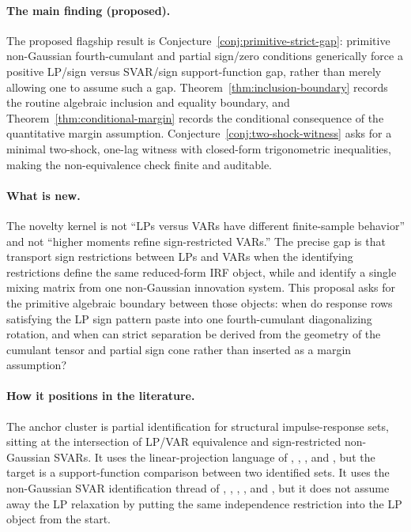 \documentclass[11pt]{article}
\theoremstyle{definition}
\theoremstyle{plain}
\theoremstyle{remark}
\begin{document}
\paragraph{The main finding (proposed).}
The proposed flagship result is Conjecture~\ref{conj:primitive-strict-gap}: primitive non-Gaussian fourth-cumulant and partial sign/zero conditions generically force a positive LP/sign versus SVAR/sign support-function gap, rather than merely allowing one to assume such a gap.  Theorem~\ref{thm:inclusion-boundary} records the routine algebraic inclusion and equality boundary, and Theorem~\ref{thm:conditional-margin} records the conditional consequence of the quantitative margin assumption.  Conjecture~\ref{conj:two-shock-witness} asks for a minimal two-shock, one-lag witness with closed-form trigonometric inequalities, making the non-equivalence check finite and auditable.

\paragraph{What is new.}
The novelty kernel is not ``LPs versus VARs have different finite-sample behavior'' and not ``higher moments refine sign-restricted VARs.''  The precise gap is that \citet{PlagborgMollerWolf2021} transport sign restrictions between LPs and VARs when the identifying restrictions define the same reduced-form IRF object, while \citet{LanneMeitzSaikkonen2017} and \citet{GourierouxMonfortRenne2017} identify a single mixing matrix from one non-Gaussian innovation system.  This proposal asks for the primitive algebraic boundary between those objects: when do response rows satisfying the LP sign pattern paste into one fourth-cumulant diagonalizing rotation, and when can strict separation be derived from the geometry of the cumulant tensor and partial sign cone rather than inserted as a margin assumption?

\paragraph{How it positions in the literature.}
The anchor cluster is partial identification for structural impulse-response sets, sitting at the intersection of LP/VAR equivalence and sign-restricted non-Gaussian SVARs.  It uses the linear-projection language of \citet{Jorda2005}, \citet{PlagborgMollerWolf2021}, \citet{MontielOleaPlagborgMoller2021}, and \citet{MontielOleaPlagborgMollerQianWolf2024}, but the target is a support-function comparison between two identified sets.  It uses the non-Gaussian SVAR identification thread of \citet{GourierouxMonfortRenne2017}, \citet{LanneMeitzSaikkonen2017}, \citet{Guay2021}, \citet{LanneLuoto2021}, and \citet{DrautzburgWright2023}, but it does not assume away the LP relaxation by putting the same independence restriction into the LP object from the start.
\end{document}
